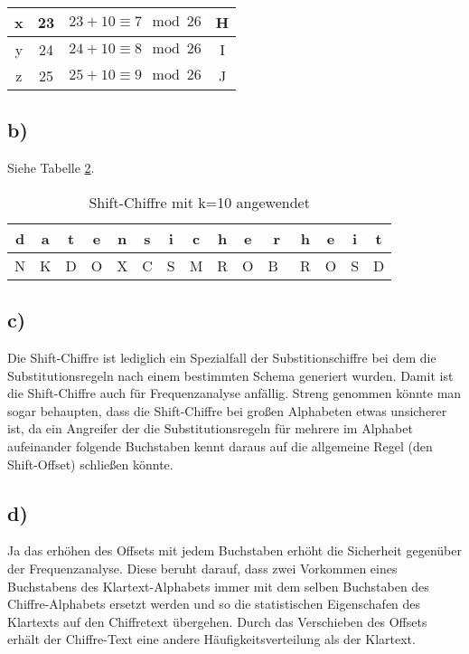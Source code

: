 \documentclass[10pt,a4paper]{article}
\begin{document}
\begin{table}[htdp]
\begin{center}
\begin{tabular}{|c|c|c|c|}
	x & 23 & \begin{math} 23 + 10 \equiv 7 \mod 26 \end{math}  & H \\ \hline
	y & 24 & \begin{math} 24 + 10 \equiv 8 \mod 26 \end{math} & I \\ \hline
	z & 25 & \begin{math} 25 + 10 \equiv 9 \mod 26 \end{math} & J \\ \hline
\end{tabular}
\end{center}
\label{tbl:alphabet}
\end{table}%

\subsection*{b)}
Siehe Tabelle \ref{tbl:encryption}. 
\begin{table}[htdp]
\caption{Shift-Chiffre mit k=10 angewendet}
\begin{center}
\begin{tabular}{|c|c|c|c|c|c|c|c|c|c|c|c|c|c|c|}
	d & a &  t & e & n & s & i & c & h & e & r & h & e  & i & t \\ \hline
	 N & K & D & O & X & C & S & M & R & O & B\ & R & O & S & D \\ \hline
\end{tabular}
\end{center}
\label{tbl:encryption}
\end{table}%
\subsection*{c)}
Die Shift-Chiffre ist lediglich ein Spezialfall der Substitionschiffre bei dem die Substitutionsregeln nach einem bestimmten Schema generiert wurden. Damit ist die Shift-Chiffre auch für Frequenzanalyse anfällig. Streng genommen könnte man sogar behaupten, dass die Shift-Chiffre bei großen Alphabeten etwas unsicherer ist, da ein Angreifer der die Substitutionsregeln für mehrere im Alphabet aufeinander folgende Buchstaben kennt daraus auf die allgemeine Regel (den Shift-Offset) schließen könnte.
\subsection*{d)}
Ja das erhöhen des Offsets mit jedem Buchstaben erhöht die Sicherheit gegenüber der Frequenzanalyse. Diese beruht darauf, dass zwei Vorkommen eines Buchstabens des Klartext-Alphabets immer mit dem selben Buchstaben des Chiffre-Alphabets ersetzt werden und so die statistischen Eigenschafen des Klartexts auf den Chiffretext übergehen. Durch das Verschieben des Offsets erhält der Chiffre-Text eine andere Häufigkeitsverteilung als der Klartext.
\end{document}
